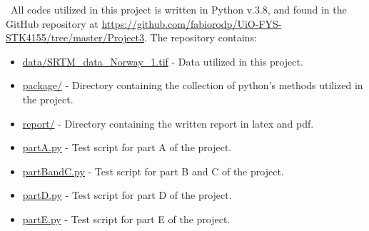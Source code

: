 \quad \, All codes utilized in this project is written in Python v.3.8, and found in the GitHub repository at \href{https://github.com/fabiorodp/UiO-FYS-STK4155/tree/master/Project3}{https://github.com/fabiorodp/UiO-FYS-STK4155/tree/master/Project3}. The repository contains:

\begin{itemize}
\item \href{https://github.com/fabiorodp/UiO-FYS-STK4155/tree/master/Project2/data/SRTM_data_Norway_1.tif}{data/SRTM\_data\_Norway\_1.tif} - Data utilized in this project.
\item \href{https://github.com/fabiorodp/UiO-FYS-STK4155/tree/master/Project2/package/}{package/} - Directory containing the collection of python's methods utilized in the project.
\item \href{https://github.com/fabiorodp/UiO-FYS-STK4155/tree/master/Project2/report/}{report/} - Directory containing the written report in latex and pdf.
\item \href{https://github.com/fabiorodp/UiO-FYS-STK4155/tree/master/Project2/partA.py}{partA.py} - Test script for part A of the project.
\item \href{https://github.com/fabiorodp/UiO-FYS-STK4155/tree/master/Project2/partBandC.py}{partBandC.py} - Test script for part B and C of the project.
\item \href{https://github.com/fabiorodp/UiO-FYS-STK4155/tree/master/Project2/partD.py}{partD.py} - Test script for part D of the project.
\item \href{https://github.com/fabiorodp/UiO-FYS-STK4155/tree/master/Project2/partE.py}{partE.py} - Test script for part E of the project.
\end{itemize}
